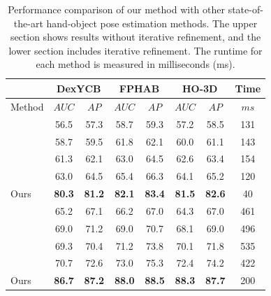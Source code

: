 \begin{table}[h]
\caption{Performance comparison of our method with other state-of-the-art hand-object pose estimation methods. The upper section shows results without iterative refinement, and the lower section includes iterative refinement. The runtime for each method is measured in milliseconds (ms).}
\label{tab:compare_ho}
\begin{center}
\begin{tabular}{|l|c|c|c|c|c|c|c|} 
\hline
& \multicolumn{2}{c|}{DexYCB} & \multicolumn{2}{c|}{FPHAB} & \multicolumn{2}{c|}{HO-3D} & Time \\
\hline
Method & $AUC$ & $AP$ & $AUC$ & $AP$ & $AUC$ & $AP$ & $ms$ \\  
\hline 
\cite{doosti2020hope} & 56.5 & 57.3 & 58.7 & 59.3 & 57.2 & 58.5 & 131 \\
\cite{lin2023harmonious} & 58.7 & 59.5 & 61.8 & 62.1 & 60.0 & 61.1 & 143 \\
\cite{wang2023interacting} & 61.3 & 62.1 & 63.0 & 64.5 & 62.6 & 63.4 & 154 \\
\cite{qi2024hoisdf} & 63.0 & 64.5 & 65.4 & 66.3 & 64.1 & 65.2 & 120 \\
Ours & \textbf{80.3} & \textbf{81.2} & \textbf{82.1} & \textbf{83.4} & \textbf{81.5} & \textbf{82.6} & 40 \\
\hline
\cite{doosti2020hope} & 65.2 & 67.1 & 66.2 & 67.0 & 64.3 & 67.0 & 461 \\
\cite{lin2023harmonious} & 69.0 & 71.2 & 69.0 & 70.7 & 68.1 & 69.0 & 496 \\
\cite{wang2023interacting} & 69.3 & 70.4 & 71.2 & 73.8 & 70.1 & 71.8 & 535 \\
\cite{qi2024hoisdf} & 70.7 & 72.6 & 73.0 & 75.3 & 72.4 & 74.2 & 422 \\
Ours & \textbf{86.7} & \textbf{87.2} & \textbf{88.0} & \textbf{88.5} & \textbf{88.3} & \textbf{87.7} & 200 \\
\hline
\end{tabular}
\end{center}
\end{table}

